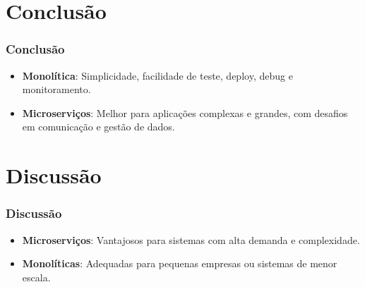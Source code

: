 \documentclass{beamer}
\begin{document}
\section{Conclusão}

\begin{frame}
\frametitle{Conclusão}
\begin{itemize}
    \item \textbf{Monolítica}: Simplicidade, facilidade de teste, deploy, debug e monitoramento.
    \item \textbf{Microserviços}: Melhor para aplicações complexas e grandes, com desafios em comunicação e gestão de dados.
\end{itemize}
\end{frame}

\section{Discussão}

\begin{frame}
\frametitle{Discussão}
\begin{itemize}
    \item \textbf{Microserviços}: Vantajosos para sistemas com alta demanda e complexidade.
    \item \textbf{Monolíticas}: Adequadas para pequenas empresas ou sistemas de menor escala.
\end{itemize}
\end{frame}
\end{document}
